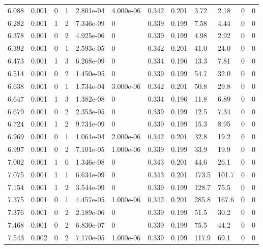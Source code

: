 \documentclass[preview]{standalone}
\begin{document}
{{{\begin{tabular}{L{1.2cm}C{1.2cm} C{0.3cm}C{0.5cm} C{1.4cm}C{1.4cm} C{1.4cm}C{1.4cm} C{1.6cm}C{1.6cm} C{1.6cm}C{1.6cm}}
  6.088  &  0.001  & 0     &  1 &  2.801e-04  & 4.000e-06  &  0.342&   0.201& 3.72 & 2.18   &  0 & 0  \\ 
  6.282  &  0.001  & 1     &  2 &  7.346e-09  & 0  &  0.339&   0.199& 7.58 & 4.44   &  0 & 0  \\ 
  6.378  &  0.001  & 0     &  2 &  4.925e-06  & 0  &  0.339&   0.199& 4.98 & 2.92   &  0 & 0  \\ 
  6.392  &  0.001  & 0     &  1 &  2.593e-05  & 0  &  0.342&   0.201& 41.0 & 24.0   &  0 & 0  \\ 
  6.473  &  0.001  & 1     &  3 &  6.268e-09  & 0  &  0.334&   0.196& 13.3 & 7.81   &  0 & 0  \\ 
  6.514  &  0.001  & 0     &  2 &  1.450e-05  & 0  &  0.339&   0.199& 54.7 & 32.0   &  0 & 0  \\ 
  6.638  &  0.001  & 0     &  1 &  1.734e-04  & 3.000e-06  &  0.342&   0.201& 50.8 & 29.8   &  0 & 0  \\ 
  6.647  &  0.001  & 1     &  3 &  1.382e-08  & 0  &  0.334&   0.196& 11.8 & 6.89   &  0 & 0  \\ 
  6.679  &  0.001  & 0     &  2 &  2.353e-05  & 0  &  0.339&   0.199& 12.5 & 7.34   &  0 & 0  \\ 
  6.724  &  0.001  & 1     &  2 &  9.731e-09  & 0  &  0.339&   0.199& 15.3 & 8.95   &  0 & 0  \\ 
  6.969  &  0.001  & 0     &  1 &  1.061e-04  & 2.000e-06  &  0.342&   0.201& 32.8 & 19.2   &  0 & 0  \\ 
  6.997  &  0.001  & 0     &  2 &  7.101e-05  & 1.000e-06  &  0.339&   0.199& 33.9 & 19.9   &  0 & 0  \\ 
  7.002  &  0.001  & 1     &  0 &  1.346e-08  & 0  &  0.343&   0.201& 44.6 & 26.1   &  0 & 0  \\ 
  7.075  &  0.001  & 1     &  1 &  6.634e-09  & 0  &  0.343&   0.201& 173.5 & 101.7   &  0 & 0  \\ 
  7.154  &  0.001  & 1     &  2 &  3.544e-09  & 0  &  0.339&   0.199& 128.7 & 75.5   &  0 & 0  \\ 
  7.375  &  0.001  & 0     &  1 &  4.457e-05  & 1.000e-06  &  0.342&   0.201& 285.8 & 167.6   &  0 & 0  \\ 
  7.376  &  0.001  & 0     &  2 &  2.189e-06  & 0  &  0.339&   0.199& 51.5 & 30.2   &  0 & 0  \\ 
  7.468  &  0.001  & 0     &  2 &  6.830e-07  & 0  &  0.339&   0.199& 75.5 & 44.2   &  0 & 0  \\ 
  7.543  &  0.002  & 0     &  2 &  7.170e-05  & 1.000e-06  &  0.339&   0.199& 117.9 & 69.1   &  0 & 0  \\ 

\end{tabular}}}}
\end{document}
